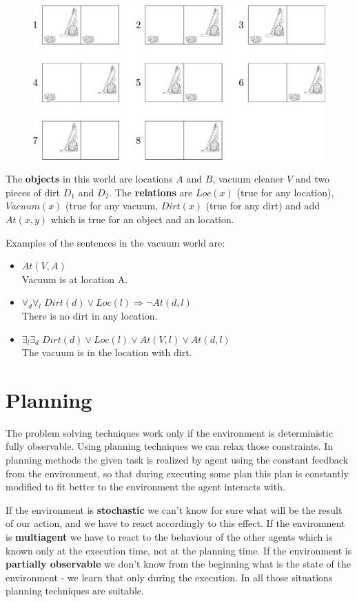 \documentclass[a4paper,10pt]{article}
\begin{document}
\begin{figure}[h!]
\centering
\includegraphics[height=0.3\textwidth]{vacuum_world.pdf}
\end{figure}

The \textbf{objects} in this world are locations $A$ and $B$, vacuum cleaner $V$ and two pieces of dirt $D_1$ and $D_2$. The \textbf{relations } are $Loc(x)$ (true for any location), $Vacuum(x)$ (true for any vacuum, $Dirt(x)$ (true for any dirt) and add $At(x,y)$ which is true for an object and an location.

Examples of the sentences in the vacuum world are:
\begin{itemize}
\setlength{\itemsep}{0pt}
\setlength{\parskip}{0pt}
\setlength{\parsep}{0pt}
\item $At(V,A)$ \\Vacuum is at location A.
\item $\forall_d \forall_l \; Dirt(d) \vee Loc(l) \Rightarrow \lnot At(d,l)$ \\There is no dirt in any location.
\item $\exists_l \exists_d \; Dirt(d) \vee Loc(l) \vee At(V,l) \vee At(d,l) $ \\The vacuum is in the location with dirt.
\end{itemize}

\section{Planning}

The problem solving techniques work only if the environment is deterministic fully observable. Using planning techniques we can relax those constraints. In planning methods the given task is realized by agent using the constant feedback from the environment, so that during executing some plan this plan is constantly modified to fit better to the environment the agent interacts with.

If the environment is \textbf{stochastic} we can't know for sure what will be the result of our action, and we have to react accordingly to this effect. If the environment is \textbf{multiagent}  we have to react to the behaviour of the other agents which is known only at the execution time, not at the planning time. If the environment is \textbf{partially observable} we don't know from the beginning what is the state of the environment - we learn that only during the execution. In all those situations planning techniques are suitable.
\end{document}
